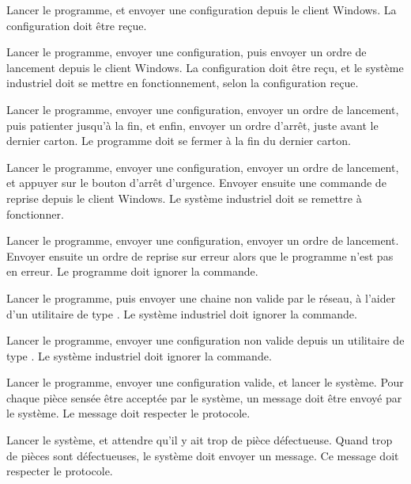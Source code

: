 {Lancer le programme, et envoyer une configuration depuis le client Windows.}
{La configuration doit être reçue.}

{Lancer le programme, envoyer une configuration, puis envoyer un ordre de
lancement depuis le client Windows.}
{La configuration doit être reçu, et le système industriel doit se mettre en
fonctionnement, selon la configuration reçue.}

{Lancer le programme, envoyer une configuration, envoyer un ordre de lancement,
puis patienter jusqu'à la fin, et enfin, envoyer un ordre d'arrêt, juste
avant le dernier carton.}
{Le programme doit se fermer à la fin du dernier carton.}

{Lancer le programme, envoyer une configuration, envoyer un ordre de lancement,
et appuyer sur le bouton d'arrêt d'urgence. Envoyer ensuite une commande de
    reprise depuis le client Windows.}
{Le système industriel doit se remettre à fonctionner.}

{Lancer le programme, envoyer une configuration, envoyer un ordre de lancement.
Envoyer ensuite un ordre de reprise sur erreur alors que le programme n'est pas
en erreur.}
{Le programme doit ignorer la commande.}

{Lancer le programme, puis envoyer une chaine non valide par le réseau, à
    l'aider d'un utilitaire de type .}
{Le système industriel doit ignorer la commande.}

{Lancer le programme, envoyer une configuration non valide depuis un utilitaire
    de type .}
{Le système industriel doit ignorer la commande.}

{Lancer le programme, envoyer une configuration valide, et lancer le système.}
{Pour chaque pièce sensée être acceptée par le système, un message doit être
    envoyé par le système. Le message doit respecter le protocole.}

{Lancer le système, et attendre qu'il y ait trop de pièce défectueuse.}
{Quand trop de pièces sont défectueuses, le système doit envoyer un message. Ce
message doit respecter le protocole.}

